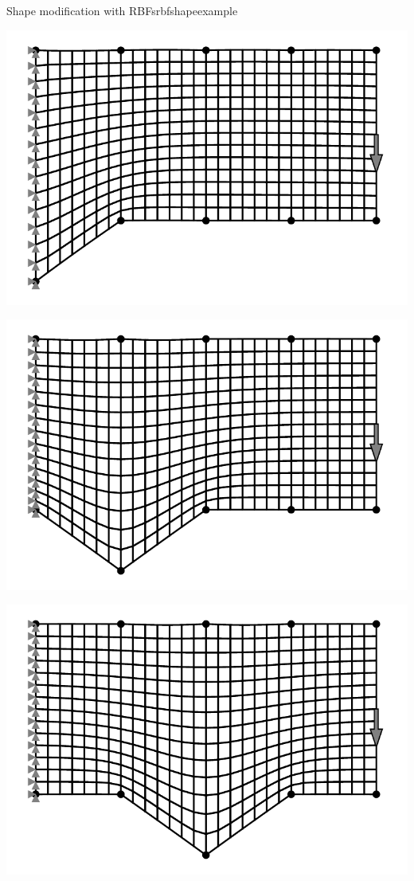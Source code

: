 \begin{example}{Shape modification with RBFs}{rbfshapeexample}
    \begin{minipage}{.5\textwidth}
        \centering
        \includegraphics[width=0.9\linewidth]{figures/cantilever_fem_shape_0_linear.pdf}
    \end{minipage}%
    \begin{minipage}{.5\textwidth}
        \centering
        \includegraphics[width=0.9\linewidth]{figures/cantilever_fem_shape_1_linear.pdf}
    \end{minipage}
    \begin{minipage}{.5\textwidth}
        \centering
        \includegraphics[width=0.9\linewidth]{figures/cantilever_fem_shape_2_linear.pdf}

\end{minipage}
\end{example}
